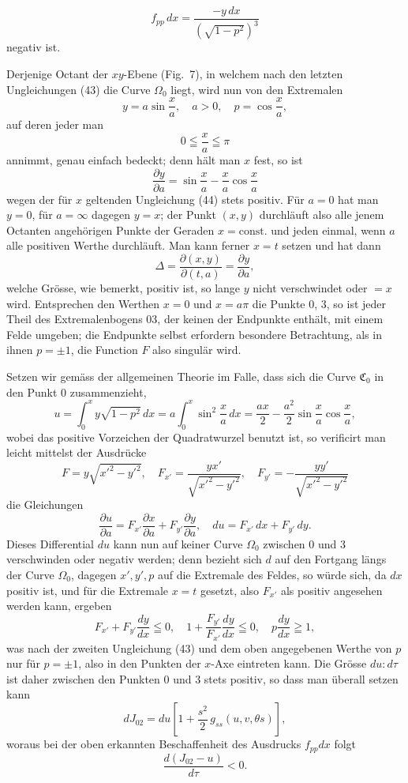 \documentclass[11pt,a4paper,leqno]{article}
\begin{document}
\[
f_{pp}\,dx=\frac{-y\,dx}{\left(\sqrt{1-p^2}\right)^3}
\]
negativ ist.

Derjenige Octant der $xy$-Ebene (Fig.~7), in welchem nach den letzten Ungleichungen (43) die Curve $\Omega_0$ liegt, wird nun von den Extremalen
\[
y=a\sin\frac{x}{a},\quad a>0,\quad p=\cos\frac{x}{a},
\]
auf deren jeder man
\begin{equation}\tag{44}
0\leqq\frac{x}{a}\leqq\pi
\end{equation}
annimmt, genau einfach bedeckt; denn hält man $x$ fest, so ist
\[
\frac{\partial y}{\partial a}
=\sin\frac{x}{a}-\frac{x}{a}\cos\frac{x}{a}
\]
wegen der für $x$ geltenden Ungleichung (44) stets positiv. Für $a=0$ hat man $y=0$, für $a=\infty$ dagegen $y=x$; der Punkt $(x,y)$ durchläuft also alle jenem Octanten angehörigen Punkte der Geraden $x=\text{const.}$ und jeden einmal, wenn $a$ alle positiven Werthe durchläuft. Man kann ferner $x=t$ setzen und hat dann
\[
\Delta=\frac{\partial(x,y)}{\partial(t,a)}
=\frac{\partial y}{\partial a},
\]
welche Grösse, wie bemerkt, positiv ist, so lange $y$ nicht verschwindet oder $=x$ wird. Entsprechen den Werthen $x=0$ und $x=a\pi$ die Punkte 0, 3, so ist jeder Theil des Extremalenbogens 03, der keinen der Endpunkte enthält, mit einem Felde umgeben; die Endpunkte selbst erfordern besondere Betrachtung, als in ihnen $p=\pm1$, die Function $F$ also singulär wird.

Setzen wir gemäss der allgemeinen Theorie im Falle, dass sich die Curve $\mathfrak{C}_0$ in den Punkt 0 zusammenzieht,
\[
u=\int_0^x y\sqrt{1-p^2}\,dx
=a\int_0^x\sin^2\frac{x}{a}\,dx
=\frac{ax}{2}-\frac{a^2}{2}\sin\frac{x}{a}\cos\frac{x}{a},
\]
wobei das positive Vorzeichen der Quadratwurzel benutzt ist, so verificirt man leicht mittelst der Ausdrücke
\[
F=y\sqrt{x'^2-y'^2},\quad
F_{x'}=\frac{yx'}{\sqrt{x'^2-y'^2}},\quad
F_{y'}=-\frac{yy'}{\sqrt{x'^2-y'^2}}
\]
die Gleichungen
\[
\frac{\partial u}{\partial a}
=
F_{x'}\frac{\partial x}{\partial a}
+
F_{y'}\frac{\partial y}{\partial a},
\quad
du=F_{x'}\,dx+F_{y'}\,dy.
\]
Dieses Differential $du$ kann nun auf keiner Curve $\Omega_0$ zwischen 0 und 3 verschwinden oder negativ werden; denn bezieht sich $d$ auf den Fortgang längs der Curve $\Omega_0$, dagegen $x',y',p$ auf die Extremale des Feldes, so würde sich, da $dx$ positiv ist, und für die Extremale $x=t$ gesetzt, also $F_{x'}$ als positiv angesehen werden kann, ergeben
\[
F_{x'}+F_{y'}\frac{dy}{dx}\leqq0,\quad
1+\frac{F_{y'}}{F_{x'}}\frac{dy}{dx}\leqq0,\quad
p\frac{dy}{dx}\geqq1,
\]
was nach der zweiten Ungleichung (43) und dem oben angegebenen Werthe von $p$ nur für $p=\pm1$, also in den Punkten der $x$-Axe eintreten kann. Die Grösse $du:d\tau$ ist daher zwischen
den Punkten 0 und 3 stets positiv, so dass man überall setzen kann
\[
dJ_{02}=du\left[1+\frac{s^2}{2}\,g_{ss}(u,v,\theta s)\right],
\]
woraus bei der oben erkannten Beschaffenheit des Ausdrucks $f_{pp}dx$ folgt
\[
\frac{d(J_{02}-u)}{d\tau}<0.
\]
\end{document}
